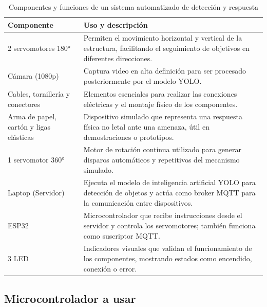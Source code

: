 \documentclass{article}
\begin{document}
\begin{table}[H]
\centering
\begin{tabular}{|p{5cm}|p{9cm}|}
\hline
\textbf{Componente} & \textbf{Uso y descripción} \\
\hline
2 servomotores 180° & Permiten el movimiento horizontal y vertical de la estructura, facilitando el seguimiento de objetivos en diferentes direcciones. \\
\hline
Cámara (1080p) & Captura video en alta definición para ser procesado posteriormente por el modelo YOLO. \\
\hline
Cables, tornillería y conectores & Elementos esenciales para realizar las conexiones eléctricas y el montaje físico de los componentes. \\
\hline
Arma de papel, cartón y ligas elásticas & Dispositivo simulado que representa una respuesta física no letal ante una amenaza, útil en demostraciones o prototipos. \\
\hline
1 servomotor 360° & Motor de rotación continua utilizado para generar disparos automáticos y repetitivos del mecanismo simulado. \\
\hline
Laptop (Servidor) & Ejecuta el modelo de inteligencia artificial YOLO para detección de objetos y actúa como broker MQTT para la comunicación entre dispositivos. \\
\hline
ESP32 & Microcontrolador que recibe instrucciones desde el servidor y controla los servomotores; también funciona como suscriptor MQTT. \\
\hline
3 LED & Indicadores visuales que validan el funcionamiento de los componentes, mostrando estados como encendido, conexión o error. \\
\hline
\end{tabular}
\caption{Componentes y funciones de un sistema automatizado de detección y respuesta}
\end{table}


\subsection{Microcontrolador a usar}
\end{document}
